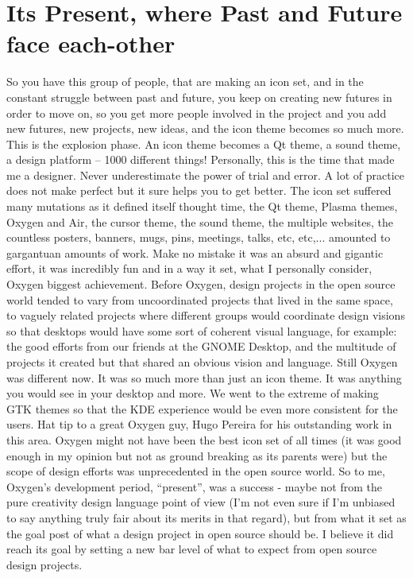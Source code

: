 \section*{Its Present, where Past and Future face each-other}
So you have this group of people, that are making an icon set, and in the constant struggle between past and future, you keep on creating new futures in order to move on, so you get more people involved in the project and you add new futures, new projects, new ideas, and the icon theme becomes so much more. This is the explosion phase. An icon theme becomes a Qt theme, a sound theme, a design platform – 1000 different things!
Personally, this is the time that made me a designer. Never underestimate the power of trial and error. A lot of practice does not make perfect but it sure helps you to get better.
The icon set suffered many mutations as it defined itself thought time, the Qt theme, Plasma themes, Oxygen and Air, the cursor theme, the sound theme, the multiple websites, the countless posters, banners, mugs, pins, meetings, talks, etc, etc,... amounted to gargantuan amounts of work. 
Make no mistake it was an absurd and gigantic effort, it was incredibly fun and in a way it set, what I personally consider, Oxygen biggest achievement.
Before Oxygen, design projects in the open source world tended to vary from uncoordinated projects that lived in the same space, to vaguely related projects where different groups would coordinate design visions so that desktops would have some sort of coherent visual language, for example: the good efforts from our friends at the GNOME Desktop, and the multitude of projects it created but that shared an obvious vision and language.
Still Oxygen was different now. It was so much more than just an icon theme. It was anything you would see in your desktop and more. We went to the extreme of making GTK themes so that the KDE experience would be even more consistent for the users. Hat tip to a great Oxygen guy, Hugo Pereira for his outstanding work in this area.
Oxygen might not have been the best icon set of all times (it was good enough in my opinion but not as ground breaking as its parents were) but the scope of design efforts was unprecedented in the open source world. 
So to me, Oxygen's development period, “present”,  was a success - maybe not from the pure creativity design language point of view (I'm not even sure if I'm unbiased to say anything truly fair about its merits in that regard), but from what it set as the goal post of what a design project in open source should be. I believe it did reach its goal by setting a new bar level of what to expect from open source design projects.

